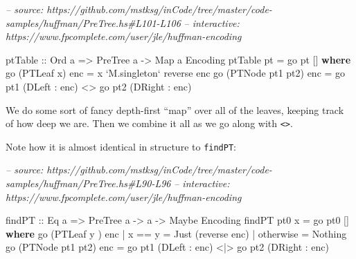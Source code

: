 \documentclass[]{article}
\newenvironment{Shaded}{}{}
\newcommand{\CommentTok}[1]{\textcolor[rgb]{0.38,0.63,0.69}{\textit{#1}}}
\newcommand{\DataTypeTok}[1]{\textcolor[rgb]{0.56,0.13,0.00}{#1}}
\newcommand{\FunctionTok}[1]{\textcolor[rgb]{0.02,0.16,0.49}{#1}}
\newcommand{\KeywordTok}[1]{\textcolor[rgb]{0.00,0.44,0.13}{\textbf{#1}}}
\newcommand{\NormalTok}[1]{#1}
\newcommand{\OtherTok}[1]{\textcolor[rgb]{0.00,0.44,0.13}{#1}}
\begin{document}
\begin{Shaded}
\begin{Highlighting}[]
\CommentTok{-- source: https://github.com/mstksg/inCode/tree/master/code-samples/huffman/PreTree.hs#L101-L106}
\CommentTok{-- interactive: https://www.fpcomplete.com/user/jle/huffman-encoding}

\OtherTok{ptTable ::} \DataTypeTok{Ord}\NormalTok{ a }\OtherTok{=>} \DataTypeTok{PreTree}\NormalTok{ a }\OtherTok{->} \DataTypeTok{Map}\NormalTok{ a }\DataTypeTok{Encoding}
\NormalTok{ptTable pt }\FunctionTok{=}\NormalTok{ go pt []}
  \KeywordTok{where}
\NormalTok{    go (}\DataTypeTok{PTLeaf}\NormalTok{ x) enc       }\FunctionTok{=}\NormalTok{ x }\OtherTok{`M.singleton`}\NormalTok{ reverse enc}
\NormalTok{    go (}\DataTypeTok{PTNode}\NormalTok{ pt1 pt2) enc }\FunctionTok{=}\NormalTok{ go pt1 (}\DataTypeTok{DLeft}  \FunctionTok{:}\NormalTok{ enc) }\FunctionTok{<>}
\NormalTok{                              go pt2 (}\DataTypeTok{DRight} \FunctionTok{:}\NormalTok{ enc)}
\end{Highlighting}
\end{Shaded}

We do some sort of fancy depth-first ``map'' over all of the leaves, keeping
track of how deep we are. Then we combine it all as we go along with
\texttt{\textless{}\textgreater{}}.

Note how it is almost identical in structure to \texttt{findPT}:

\begin{Shaded}
\begin{Highlighting}[]
\CommentTok{-- source: https://github.com/mstksg/inCode/tree/master/code-samples/huffman/PreTree.hs#L90-L96}
\CommentTok{-- interactive: https://www.fpcomplete.com/user/jle/huffman-encoding}

\OtherTok{findPT ::} \DataTypeTok{Eq}\NormalTok{ a }\OtherTok{=>} \DataTypeTok{PreTree}\NormalTok{ a }\OtherTok{->}\NormalTok{ a }\OtherTok{->} \DataTypeTok{Maybe} \DataTypeTok{Encoding}
\NormalTok{findPT pt0 x }\FunctionTok{=}\NormalTok{ go pt0 []}
  \KeywordTok{where}
\NormalTok{    go (}\DataTypeTok{PTLeaf}\NormalTok{ y      ) enc }\FunctionTok{|}\NormalTok{ x }\FunctionTok{==}\NormalTok{ y    }\FunctionTok{=} \DataTypeTok{Just}\NormalTok{ (reverse enc)}
                            \FunctionTok{|}\NormalTok{ otherwise }\FunctionTok{=} \DataTypeTok{Nothing}
\NormalTok{    go (}\DataTypeTok{PTNode}\NormalTok{ pt1 pt2) enc }\FunctionTok{=}\NormalTok{ go pt1 (}\DataTypeTok{DLeft}  \FunctionTok{:}\NormalTok{ enc) }\FunctionTok{<|>}
\NormalTok{                              go pt2 (}\DataTypeTok{DRight} \FunctionTok{:}\NormalTok{ enc)}
\end{Highlighting}
\end{Shaded}
\end{document}
